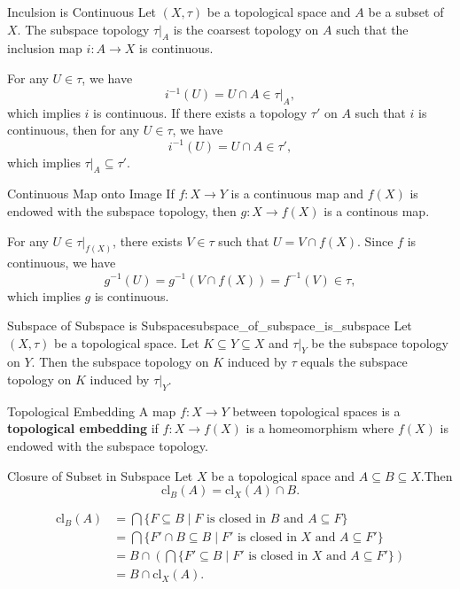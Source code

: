 \documentclass{report}
\begin{document}
\begin{proposition}{Inculsion is Continuous}{}
	Let $(X,\tau)$ be a topological space and $A$ be a subset of $X$. The subspace topology $\tau|_A$ is the coarsest topology on $A$ such that the inclusion map $i:A\to X$ is continuous.
\end{proposition}

\begin{prf}
	For any $U\in \tau$, we have
	\[
		i^{-1}(U)=U\cap A\in \tau|_A,
	\]
	which implies $i$ is continuous. If there exists a topology $\tau'$ on $A$ such that $i$ is continuous, then for any $U\in \tau$, we have
	\[
		i^{-1}(U)=U\cap A\in \tau',
	\]
	which implies $\tau|_A\subseteq \tau'$.
\end{prf}


\begin{proposition}{Continuous Map onto Image}{}
	If $f:X\to Y$ is a continuous map and $f(X)$ is endowed with the subspace topology, then $g:X\to f(X)$ is a continous map.
\end{proposition}

\begin{prf}
	For any $U\in \tau|_{f(X)}$, there exists $V\in \tau$ such that $U=V\cap f(X)$. Since $f$ is continuous, we have
	\[
		g^{-1}(U)=g^{-1}\left(V\cap f(X)\right)=f^{-1}(V)\in \tau,
	\]
	which implies $g$ is continuous.
\end{prf}



\begin{proposition}{Subspace of Subspace is Subspace}{subspace_of_subspace_is_subspace}
	Let $(X, \tau)$ be a topological space. Let $K \subseteq Y \subseteq X$ and $\tau |_Y$ be the subspace topology on $Y$. Then the subspace topology on $K$ induced by $\tau$ equals the subspace topology on $K$ induced by $\tau|_Y$.
\end{proposition}

\begin{definition}{Topological Embedding}{}
	A map $f:X\to Y$ between topological spaces is a \textbf{topological embedding} if $f:X\to f(X)$ is a homeomorphism where $f(X)$ is endowed with the subspace topology.
\end{definition}


\begin{proposition}{Closure of Subset in Subspace}{}
	Let $X$ be a topological space and $A\subseteq B\subseteq X$.Then 
	\[
	\mathrm{cl}_{B}(A)=\mathrm{cl}_{X}(A)\cap B.
	\]
\end{proposition}
\begin{prf}
	\begin{align*}
		\mathrm{cl}_{B}(A)&=\bigcap\{F\subseteq B\mid F\text{ is closed in $B$ and }A\subseteq F\}\\
		&=\bigcap\{F'\cap B\subseteq B\mid F'\text{ is closed in $X$ and }A\subseteq F'\}\\
		&=B\cap\left(\bigcap \{F'\subseteq B\mid F'\text{ is closed in $X$ and }A\subseteq F'\}\right)\\
		&=B\cap \mathrm{cl}_{X}(A).
	\end{align*}
	
\end{prf}
\end{document}
